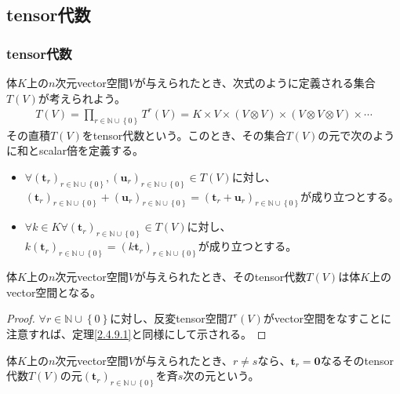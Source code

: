 \documentclass[dvipdfmx]{jsarticle}
\begin{document}
\subsection{tensor代数}%
\subsubsection{tensor代数}%
\begin{dfn}
体$K$上の$n$次元vector空間$V$が与えられたとき、次式のように定義される集合$T(V)$が考えられよう。
\begin{align*}
T(V) = \prod_{r \in \mathbb{N} \cup \left\{ 0 \right\}} {T^{r}(V)} = K \times V \times (V \otimes V) \times (V \otimes V \otimes V) \times \cdots
\end{align*}
その直積$T(V)$をtensor代数という。このとき、その集合$T(V)$の元で次のように和とscalar倍を定義する。
\begin{itemize}
\item
  $\forall\left( \mathbf{t}_{r} \right)_{r \in \mathbb{N} \cup \left\{ 0 \right\}},\left( \mathbf{u}_{r} \right)_{r \in \mathbb{N} \cup \left\{ 0 \right\}} \in T(V)$に対し、$\left( \mathbf{t}_{r} \right)_{r \in \mathbb{N} \cup \left\{ 0 \right\}} + \left( \mathbf{u}_{r} \right)_{r \in \mathbb{N} \cup \left\{ 0 \right\}} = \left( \mathbf{t}_{r} + \mathbf{u}_{r} \right)_{r \in \mathbb{N} \cup \left\{ 0 \right\}}$が成り立つとする。
\item
  $\forall k \in K\forall\left( \mathbf{t}_{r} \right)_{r \in \mathbb{N} \cup \left\{ 0 \right\}} \in T(V)$に対し、$k\left( \mathbf{t}_{r} \right)_{r \in \mathbb{N} \cup \left\{ 0 \right\}} = \left( k\mathbf{t}_{r} \right)_{r \in \mathbb{N} \cup \left\{ 0 \right\}}$が成り立つとする。
\end{itemize}
\end{dfn}
\begin{thm}\label{2.4.10.1}
体$K$上の$n$次元vector空間$V$が与えられたとき、そのtensor代数$T(V)$は体$K$上のvector空間となる。
\end{thm}
\begin{proof}
$\forall r \in \mathbb{N} \cup \left\{ 0 \right\}$に対し、反変tensor空間$T^{r}(V)$がvector空間をなすことに注意すれば、定理\ref{2.4.9.1}と同様にして示される。
\end{proof}
\begin{dfn}
体$K$上の$n$次元vector空間$V$が与えられたとき、$r \neq s$なら、$\mathbf{t}_{r} = \mathbf{0}$なるそのtensor代数$T(V)$の元$\left( \mathbf{t}_{r} \right)_{r \in \mathbb{N} \cup \left\{ 0 \right\}}$を斉$s$次の元という。
\end{dfn}
\end{document}
